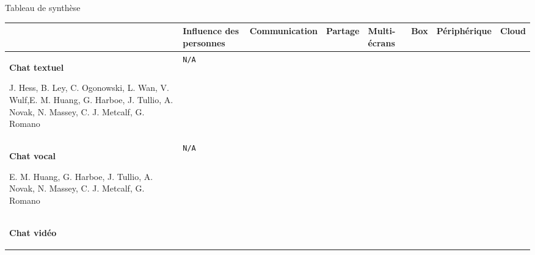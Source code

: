 \documentclass{beamer}
\newcommand{\xmark}{\ding{55}}%
\newcommand{\cmark}{\ding{51}}%
\begin{document}
	\section*{}
	\hspace{-25px}
	\begin{frame}{\hspace{10px}Tableau de synthèse}
		\vspace{-5px}
		\begin{table}[H]
		\tiny
		\begin{tabular}{|p{1.4cm}|p{1.45cm}|p{0.7cm}|p{0.6cm}|p{0.6cm}|p{0.25cm}|p{1.1cm}|p{0.6cm}|}
			\hline
			&\textbf{Influence des personnes} &\textbf{Commu\-nication} &\textbf{Partage} &\textbf{Multi-écrans} &\textbf{Box} &\textbf{Périphérique} &\textbf{Cloud}\\
			\hline
			\begin{minipage}{1.4cm}
				\vspace{0.5px}
				\textbf{Chat textuel}\newline
			\vspace{-12px}
			\begin{flushleft}
			\fontsize{4.0}{4}\selectfont 
			J. Hess, B. Ley, C. Ogonowski, L. Wan, V. Wulf,E. M. Huang, G. Harboe, J. Tullio, A. Novak, N. Massey, C. J.
			Metcalf, G. Romano
		\end{flushleft}
			\end{minipage}	
			\vspace{2px}
			& \texttt{N/A} &\cmark&\cmark&\cmark&\cmark&\cmark&\cmark\\
			\hline
			\begin{minipage}{1.4cm}
				\vspace{0.5px}
				\textbf{Chat vocal} \newline
			\vspace{-12px}
			\begin{flushleft}
			\fontsize{4}{4}\selectfont
			E. M. Huang, G. Harboe, J. Tullio, A. Novak, N. Massey, C. J. Metcalf, G. Romano
		\end{flushleft}
		\end{minipage}
			\vspace{2px}
		& \texttt{N/A} &\xmark&\cmark&\xmark&\cmark&\xmark & \cmark \\
			\hline
			\begin{minipage}{1.4cm}
				\vspace{0.5px}
				\textbf{Chat vidéo}\newline
			\vspace{-12px}
			\begin{flushleft}

\end{flushleft}
\end{minipage}
\end{tabular}
\end{table}
\end{frame}
\end{document}
